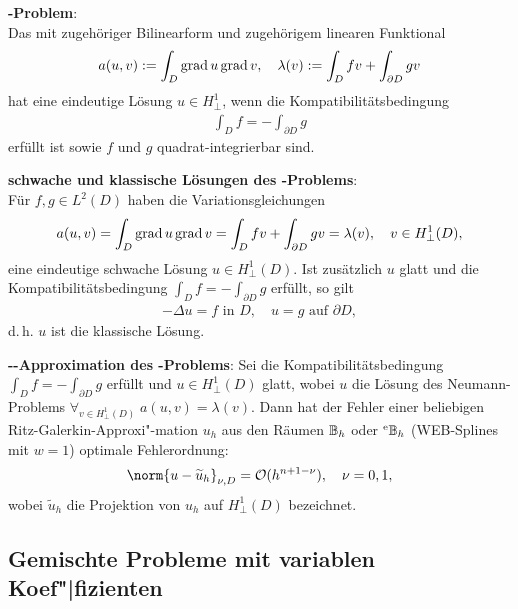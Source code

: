 \linie

\textbf{-Problem}:\\
Das  mit zugehöriger Bilinearform und zugehörigem linearen
Funktional
\begin{align*}
    a(u, v) := \int_D \operatorname{grad} u \operatorname{grad} v,\quad
    \lambda(v) := \int_D fv + \int_{\partial D} gv
\end{align*}
hat eine eindeutige Lösung $u \in H_\perp^1$, wenn die Kompatibilitätsbedingung
\begin{align*}
    \int_D f = -\int_{\partial D} g
\end{align*}
erfüllt ist sowie $f$ und $g$ quadrat-integrierbar sind.

\linie

\textbf{schwache und klassische Lösungen des -Problems}:\\
Für $f, g \in L^2(D)$ haben die Variationsgleichungen
\begin{align*}
    a(u, v) = \int_D \operatorname{grad} u \operatorname{grad} v = \int_D fv + \int_{\partial D} gv = \lambda(v),\quad
    v \in H_\perp^1(D),
\end{align*}
eine eindeutige schwache Lösung $u \in H_\perp^1(D)$.
Ist zusätzlich $u$ glatt und die Kompatibilitätsbedingung
$\int_D f = -\int_{\partial D} g$ erfüllt, so gilt
\begin{align*}
    -\Delta u = f \text{ in } D,\quad
    u = g \text{ auf } \partial D,
\end{align*}
d.\,h. $u$ ist die klassische Lösung.

\linie

\textbf{--Approximation des -Problems}:
Sei die Kompatibilitätsbedingung $\int_D f = -\int_{\partial D} g$ erfüllt und $u \in H_\perp^1(D)$
glatt, wobei $u$ die Lösung des Neumann-Problems
$\forall_{v \in H_\perp^1(D)}\; a(u, v) = \lambda(v)$.
Dann hat der Fehler einer beliebigen Ritz-Galerkin-Approxi"-mation $u_h$ aus den Räumen $\mathbb{B}_h$ oder
${}^{\mathrm{e}}\mathbb{B}_h$ (WEB-Splines mit $w = 1$) optimale Fehlerordnung:
\begin{align*}
    \norm{u - \widetilde{u}_h}_{\nu,D} = \O(h^{n+1-\nu}),\quad
    \nu = 0, 1,
\end{align*}
wobei $\widetilde{u}_h$ die Projektion von $u_h$ auf $H_\perp^1(D)$ bezeichnet.

\pagebreak

\subsection{%
    Gemischte Probleme mit variablen Koef"|fizienten%
}

